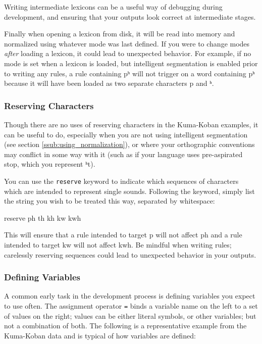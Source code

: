 \documentclass[10pt,letterpaper]{article}
\newcommand\textIPA[1]{{\fontIPA #1}}
\newcounter{excounter}
\newenvironment{vex}[1]{
	\vspace{1em}
	\refstepcounter{excounter}
	\noindent\makebox[3em][l]{(\arabic{excounter}\label{#1})}
	\minipage{\textwidth}
	\verbatim
}{
	\endverbatim
	\endminipage
	\vspace{1em}
}
\begin{document}
\noindent
Writing intermediate lexicons can be a useful way of debugging during development, and ensuring that your outputs look correct at intermediate stages.

Finally when opening a lexicon from disk, it will be read into memory and normalized using whatever mode was last defined. If you were to change modes \emph{after} loading a lexicon, it could lead to unexpected behavior. For example, if no mode is set when a lexicon is loaded, but intelligent segmentation is enabled prior to writing any rules, a rule containing \textIPA{pʰ} will not trigger on a word containing \textIPA{pʰ} because it will have been loaded as two separate characters \textIPA{p} and \textIPA{ʰ}. 


\subsubsection{Reserving Characters} 
\label{ssub:reserving_characters}
Though there are no uses of reserving characters in the Kuma-Koban examples, it can be useful to do, especially when you are not using intelligent segmentation (see section \ref{ssub:using_normalization}), or where your orthographic conventions may conflict in some way with it (such as if your language uses pre-aspirated stop, which you represent \textIPA{ʰt}).

You can use the \texttt{reserve} keyword to indicate which sequences of characters which are intended to represent single sounds. Following the keyword, simply list the string you wish to be treated this way, separated by whitespace:

\begin{vex}{ex:reserve}
reserve ph th kh kw kwh
\end{vex}

\noindent
This will ensure that a rule intended to target \textIPA{p} will not affect \textIPA{ph} and a rule intended to target \textIPA{kw} will not affect \textIPA{kwh}. Be mindful when writing rules; carelessly reserving sequences could lead to unexpected behavior in your outputs.


\subsubsection{Defining Variables}
\label{ssub:defining_variables}
A common early task in the development process is defining variables you expect to use often. The assignment operator \texttt{=} binds a variable name on the left to a set of values on the right; values can be either literal symbols, or other variables; but not a combination of both. The following is a representative example from the Kuma-Koban data and is typical of how variables are defined:
\end{document}

